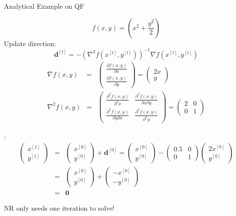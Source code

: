 \documentclass[11pt,compress,t,notes=noshow, xcolor=table]{beamer}
\begin{document}
\begin{vbframe}{Analytical Example on QF}

$$
f(x, y) = \left(x^2 + \frac{y^2}{2}\right)
$$
Update direction:
$$
\mathbf{d}^{[t]} = -\left( \nabla^2 f(x^{[t]}, y^{[t]}) \right)^{-1} \nabla f(x^{[t]}, y^{[t]})
$$
\begin{eqnarray*}
\nabla f(x, y) &=& \begin{pmatrix}
\frac{\partial f(x, y)}{\partial x} \\
\frac{\partial f(x, y)}{\partial y}
\end{pmatrix} = \begin{pmatrix}
2x \\
y
\end{pmatrix} \\
\nabla^2 f(x, y) &=& \begin{pmatrix}
\frac{\partial^2 f(x, y)}{\partial^2 x} & \frac{\partial^2 f(x, y)}{\partial x \partial y} \\
\frac{\partial^2 f(x, y)}{\partial y \partial x} & \frac{\partial^2 f(x, y)}{\partial^2 y}
\end{pmatrix} = \begin{pmatrix}
2 & 0 \\
0 & 1
\end{pmatrix}
\end{eqnarray*}

\framebreak

:
\begin{eqnarray*}
\begin{pmatrix}
x^{[1]} \\
y^{[1]}
\end{pmatrix} &=& \begin{pmatrix}
x^{[0]} \\
y^{[0]}
\end{pmatrix} + \mathbf{d}^{[0]} = \begin{pmatrix}
x^{[0]} \\
y^{[0]}
\end{pmatrix} - \begin{pmatrix}
0.5 &  0 \\
0 & 1
\end{pmatrix} \begin{pmatrix}
2x^{[0]} \\
y^{[0]}
\end{pmatrix} \\
&=& \begin{pmatrix}
x^{[0]} \\
y^{[0]}
\end{pmatrix} + \begin{pmatrix}
-x^{[0]} \\
-y^{[0]}
\end{pmatrix} \\
&=& \mathbf{0}
\end{eqnarray*}

NR only needs one iteration to solve!


\end{vbframe}
\end{document}
